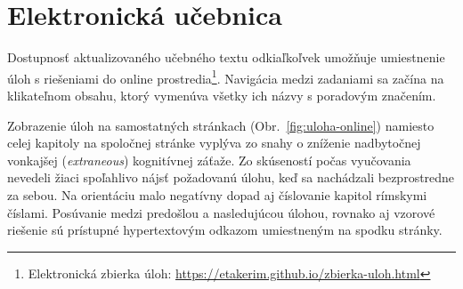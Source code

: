 \section{Elektronická učebnica}
Dostupnosť aktualizovaného učebného textu odkiaľkoľvek umožňuje umiestnenie úloh s riešeniami do online prostredia\footnote{Elektronická zbierka úloh: \url{https://etakerim.github.io/zbierka-uloh.html}}. Navigácia medzi zadaniami sa začína na klikateľnom obsahu, ktorý vymenúva všetky ich názvy s poradovým značením.

Zobrazenie úloh na samostatných stránkach (Obr.~\ref{fig:uloha-online}) namiesto celej kapitoly na spoločnej stránke vyplýva zo snahy o zníženie nadbytočnej vonkajšej (\emph{extraneous}) kognitívnej záťaže. Zo skúseností počas vyučovania nevedeli žiaci spoľahlivo nájsť požadovanú úlohu, keď sa nachádzali bezprostredne za sebou. Na orientáciu malo negatívny dopad aj číslovanie kapitol rímskymi číslami. Posúvanie medzi predošlou a nasledujúcou úlohou, rovnako aj vzorové riešenie sú prístupné hypertextovým odkazom umiestneným na spodku stránky.

